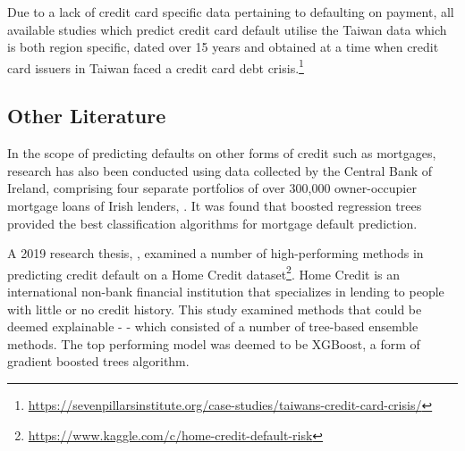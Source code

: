 \documentclass[
]{article}
\begin{document}
\vspace{.5 cm}

Due to a lack of credit card specific data pertaining to defaulting on
payment, all available studies which predict credit card default utilise
the Taiwan data which is both region specific, dated over 15 years and
obtained at a time when credit card issuers in Taiwan faced a credit
card debt crisis.\footnote{\url{https://sevenpillarsinstitute.org/case-studies/taiwans-credit-card-crisis/}}

\hypertarget{other-literature}{%
\subsection{Other Literature}\label{other-literature}}

In the scope of predicting defaults on other forms of credit such as
mortgages, research has also been conducted using data collected by the
Central Bank of Ireland, comprising four separate portfolios of over
300,000 owner-occupier mortgage loans of Irish lenders,
\citet{FITZPATRICK2016427}. It was found that boosted regression trees
provided the best classification algorithms for mortgage default
prediction. \vspace{.5 cm}

A 2019 research thesis, \citet{trap5146}, examined a number of
high-performing methods in predicting credit default on a Home Credit
dataset\footnote{\url{https://www.kaggle.com/c/home-credit-default-risk}}.
Home Credit is an international non-bank financial institution that
specializes in lending to people with little or no credit history. This
study examined methods that could be deemed explainable - - which
consisted of a number of tree-based ensemble methods. The top performing
model was deemed to be XGBoost, a form of gradient boosted trees
algorithm.
\end{document}
